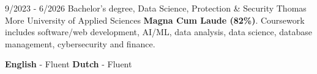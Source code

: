 \documentclass[8pt]{developercv} %
\begin{document}
\vspace{-4 pt}
\begin{entrylist}
    \entry
		{9/2023 - 6/2026}
		{Bachelor's degree, Data Science, Protection \& Security}
		{Thomas More University of Applied Sciences}
		{\textbf{Magna Cum Laude (82\%)}.  Coursework includes software/web development, AI/ML, data analysis, data science, database management, cybersecurity and finance.}
\end{entrylist}

\vspace{-4 pt}
    \vspace{-3pt}
    
    \textbf{English} - Fluent \hspace{24mm} \textbf{ Dutch} - Fluent

\end{document}
